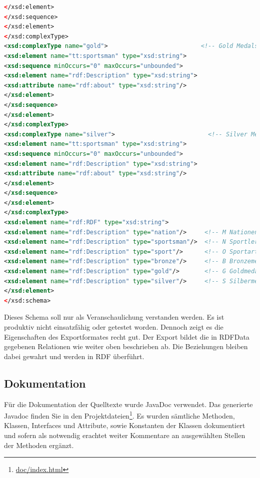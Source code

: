 \documentclass[pagesize=auto, titlepage=on]{scrartcl}
\begin{document}
\begin{lstlisting}[language=XML]
</xsd:element>
</xsd:sequence>
</xsd:element>
</xsd:complexType>
<xsd:complexType name="gold">                          <!-- Gold Medals Definition -->
<xsd:element name="tt:sportsman" type="xsd:string">
<xsd:sequence minOccurs="0" maxOccurs="unbounded">
<xsd:element name="rdf:Description" type="xsd:string">
<xsd:attribute name="rdf:about" type="xsd:string"/>
</xsd:element>
</xsd:sequence>
</xsd:element>
</xsd:complexType>
<xsd:complexType name="silver">                          <!-- Silver Medals Definition -->
<xsd:element name="tt:sportsman" type="xsd:string">
<xsd:sequence minOccurs="0" maxOccurs="unbounded">
<xsd:element name="rdf:Description" type="xsd:string">
<xsd:attribute name="rdf:about" type="xsd:string"/>
</xsd:element>
</xsd:sequence>
</xsd:element>
</xsd:complexType>
<xsd:element name="rdf:RDF" type="xsd:string">
<xsd:element name="rdf:Description" type="nation"/>     <!-- M Nationen -->
<xsd:element name="rdf:Description" type="sportsman"/>  <!-- N Sportler -->
<xsd:element name="rdf:Description" type="sport"/>      <!-- O Sportarten -->
<xsd:element name="rdf:Description" type="bronze"/>     <!-- B Bronzemedaillengewinner -->
<xsd:element name="rdf:Description" type="gold"/>       <!-- G Goldmedaillengewinner -->
<xsd:element name="rdf:Description" type="silver"/>     <!-- S Silbermedaillengewinner -->
</xsd:element>
</xsd:schema>
\end{lstlisting}
Dieses Schema soll nur als Veranschaulichung verstanden werden. Es ist produktiv nicht einsatzfähig oder getestet worden. Dennoch zeigt es die Eigenschaften des Exportformates recht gut.
Der Export bildet die in RDFData gegebenen Relationen wie weiter oben beschrieben ab. Die Beziehungen bleiben dabei gewahrt und werden in RDF überführt.
\subsection{Dokumentation}
\label{sec:Quelltextdokumentation}
Für die Dokumentation der Quelltexte wurde JavaDoc verwendet. Das generierte Javadoc finden Sie in den Projektdateien\footnote{\href{run:/doc/index.html}{doc/index.html}}. Es wurden sämtliche Methoden, Klassen, Interfaces und Attribute, sowie Konstanten der Klassen dokumentiert und sofern als notwendig erachtet weiter Kommentare an ausgewählten Stellen der Methoden ergänzt.
\end{document}
